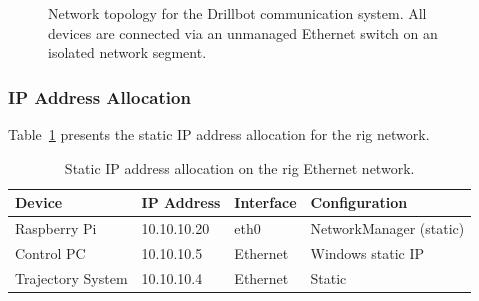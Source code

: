 \begin{figure}[htbp]
    \centering
    \caption{Network topology for the Drillbot communication system. All devices are connected via an unmanaged Ethernet switch on an isolated network segment.}
    \label{fig:network-topology}
\end{figure}

\subsubsection{IP Address Allocation}

Table~\ref{tab:ip-allocation} presents the static IP address allocation for the rig network.

\begin{table}[htbp]
    \centering
    \caption{Static IP address allocation on the rig Ethernet network.}
    \label{tab:ip-allocation}
    \begin{tabular}{llll}
        \toprule
        \textbf{Device} & \textbf{IP Address} & \textbf{Interface} & \textbf{Configuration} \\
        \midrule
        Raspberry Pi & 10.10.10.20 & eth0 & NetworkManager (static) \\
        Control PC & 10.10.10.5 & Ethernet & Windows static IP \\
        Trajectory System & 10.10.10.4 & Ethernet & Static \\
        \bottomrule
    \end{tabular}
\end{table}

